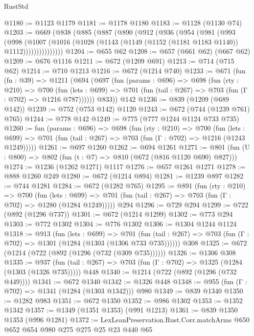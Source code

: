 \begin{lexlean}{RustStd}
\begin{coremodule}
{\begin{coremodule}
{{{{{{{@1180 := @1123 @1179
@1181 := @1178 @1180
@1183 := @1128 (@1130 @74)
@1203 := @669
    (@838
      (@885
        (@887
          (@890
            (@912
              (@936
                (@954
                  (@981
                    (@993
                      (@998
                        (@1007
                          (@1016
                            (@1028 (@1143 (@1149 (@1152 (@1181 @1183 @1140)) @1112)))))))))))))))
@1204 := @655 @62
@1208 := @657 (@661 @62) (@667 @62)
@1209 := @676 @1116
@1211 := @672 (@1209 @691)
@1213 := @714 (@715 @62)
@1214 := @710 @1213
@1216 := @672 (@1214 @740)
@1233 := @671
    (fun (fn : @39) =>
    @1211
      (@694
        (@697
          (fun (params : @696) =>
          @698
            (fun (rty : @210) =>
            @700
              (fun (lets : @699) =>
              @701 (fun (tail : @267) => @703 (fun (Γ : @702) => @1216 @787))))))
        @833))
    @142
@1236 := @839 (@1209 (@689 @142))
@1239 := @752 (@753 @142) @1120
@1243 := @672 (@744 (@1239 @761) @765)
@1244 := @778 @142
@1249 := @775 (@777 @1244 @1124 @733 @735)
@1260 := fun (params : @696) =>
  @698
    (fun (rty : @210) =>
    @700
      (fun (lets : @699) =>
      @701 (fun (tail : @267) => @703 (fun (Γ : @702) => @1216 (@1243 @1249)))))
@1261 := @697 @1260
@1262 := @694 @1261
@1271 := @801 (fun (U : @800) => @802 (fun (t : @7) => @810 (@672 (@816 @1120 @690) @827)))
@1274 := @1236 (@1262 @1271) @1117
@1276 := @657 @1261 @1271
@1278 := @888 @1260 @249
@1280 := @672 (@1214 @894)
@1281 := @1239 @897
@1282 := @744 @1281
@1284 := @672 (@1282 @765)
@1295 := @891
    (fun (rty : @210) =>
    @700
      (fun (lets : @699) =>
      @701 (fun (tail : @267) => @703 (fun (Γ : @702) => @1280 (@1284 @1249)))))
    @294
@1296 := @729 @294
@1299 := @722 (@892 (@1296 @737))
@1301 := @672 (@1214 @1299)
@1302 := @773 @294
@1303 := @772 @1302
@1304 := @776 @1302
@1306 := @1304 @1244 @1124
@1318 := @913
    (fun (lets : @699) =>
    @701 (fun (tail : @267) => @703 (fun (Γ : @702) => @1301 (@1284 (@1303 (@1306 @733 @735))))))
    @308
@1325 := @672 (@1214 (@722 (@892 (@1296 (@732 (@309 @735))))))
@1326 := @1306 @308
@1335 := @937
    (fun (tail : @267) => @703 (fun (Γ : @702) => @1325 (@1284 (@1303 (@1326 @735)))))
    @448
@1340 := @1214 (@722 (@892 (@1296 (@732 @449))))
@1341 := @672 @1340
@1342 := @1326 @448
@1348 := @955 (fun (Γ : @702) => @1341 (@1284 (@1303 @1342))) @980
@1349 := @839 @1340
@1350 := @1282 @983
@1351 := @672 @1350
@1352 := @986 @1302
@1353 := @1352 @1342
@1357 := @1349 (@1351 @1353) (@991 @1213)
@1361 := @839 @1350 @1353 (@996 @1281)
@1372 := LexLeanPreservation.Rust.Corr.matchArms @650 @652 @654 @980 @275 @275 @25 @23 @440 @65
}}}}}}}
\end{coremodule}}
\end{coremodule}
\end{lexlean}
